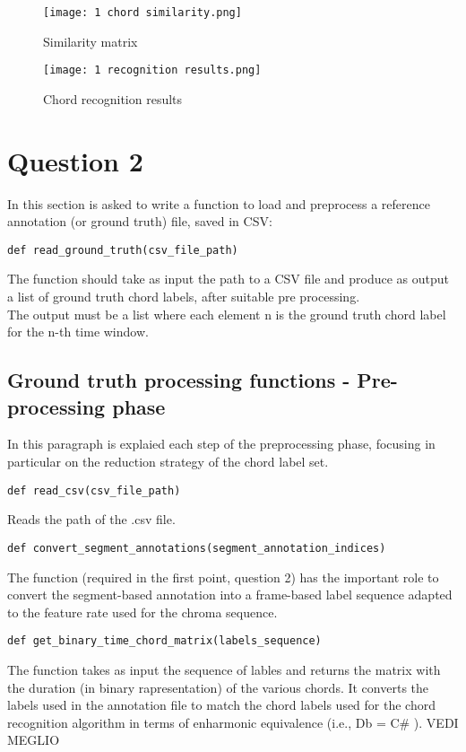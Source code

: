 \documentclass{article}
\begin{document}
\begin{figure} [H]
 \centering
 \texttt{[image: 1 chord similarity.png]}
 \caption{Similarity matrix}
\end{figure}

\begin{figure} [H]
 \centering
 \texttt{[image: 1 recognition results.png]}
 \caption{Chord recognition results}
\end{figure}

\section{Question 2}

In this section is asked to write a function to load and preprocess a reference annotation (or ground truth) file, saved in CSV:\\

\begin{lstlisting}
def read_ground_truth(csv_file_path)
\end{lstlisting}


The function should take as input the path to a CSV file and produce as output a list of ground truth chord labels, after suitable pre processing.\\
The output must be a list where each element
n is the ground truth chord label for the n-th time window.

\subsection{Ground truth processing functions - Pre-processing phase}
In this paragraph is explaied each step of the preprocessing phase, focusing in particular on the reduction strategy of the chord label set.
\begin{lstlisting}
def read_csv(csv_file_path)
\end{lstlisting}
Reads the path of the .csv file.
\begin{lstlisting}
def convert_segment_annotations(segment_annotation_indices)
\end{lstlisting}
The function (required in the first point, question 2) has the important role to convert the segment-based annotation into a frame-based label sequence adapted to the feature rate used for the chroma sequence.\\ 

\begin{lstlisting}
def get_binary_time_chord_matrix(labels_sequence) 
\end{lstlisting}
The function takes as input the sequence of lables and returns the matrix with the duration (in binary rapresentation) of the various chords. It converts the labels used in the annotation file to match the chord labels used for the chord recognition
algorithm in terms of enharmonic equivalence (i.e., Db = C# ).
VEDI MEGLIO
\end{document}
